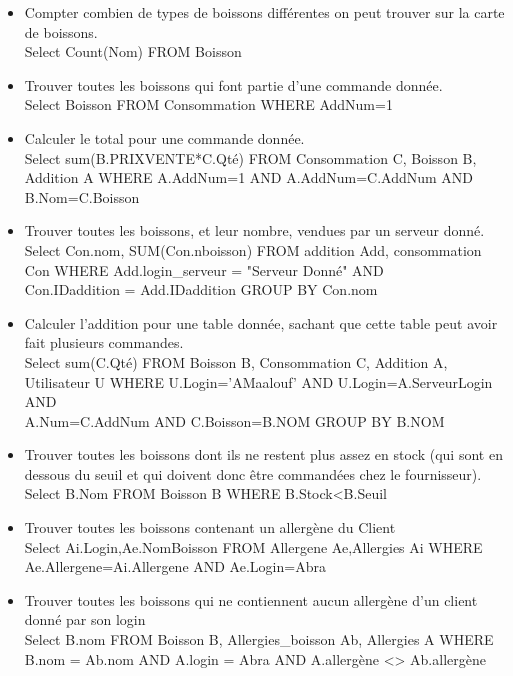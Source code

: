 \documentclass[11pt, a4, oneside, headings=normal]{scrreprt}
\begin{document}
\begin{itemize}
\item Compter combien de types de boissons différentes on peut trouver sur la carte de boissons.
\\ Select Count(Nom) FROM Boisson
\item Trouver toutes les boissons qui font partie d’une commande donnée.
 \\ Select Boisson FROM Consommation WHERE AddNum=1
\item Calculer le total pour une commande donnée.
 \\ Select sum(B.PRIXVENTE*C.Qté) FROM Consommation C, Boisson B, Addition A WHERE A.AddNum=1 AND A.AddNum=C.AddNum AND B.Nom=C.Boisson
\item Trouver toutes les boissons, et leur nombre, vendues par un serveur donné.
 \\ Select Con.nom, SUM(Con.nboisson) FROM addition Add, consommation Con WHERE Add.login\_serveur = "Serveur Donné" AND \\ Con.IDaddition = Add.IDaddition GROUP BY Con.nom
\item Calculer l’addition pour une table donnée, sachant que cette table peut avoir fait plusieurs commandes.
 \\ Select sum(C.Qté) FROM Boisson B, Consommation C, Addition A, Utilisateur U WHERE U.Login='AMaalouf' AND U.Login=A.ServeurLogin AND \\ A.Num=C.AddNum AND C.Boisson=B.NOM GROUP BY B.NOM
\item Trouver toutes les boissons dont ils ne restent plus assez en stock (qui sont en dessous du seuil et
qui doivent donc être commandées chez le fournisseur).
 \\ Select B.Nom FROM Boisson B WHERE B.Stock<B.Seuil
\item Trouver toutes les boissons contenant un allergène du Client
 \\ Select Ai.Login,Ae.NomBoisson FROM Allergene Ae,Allergies Ai WHERE \\ Ae.Allergene=Ai.Allergene AND Ae.Login=Abra
\item Trouver toutes les boissons qui ne contiennent aucun allergène d'un client donné par son login
 \\ Select B.nom FROM Boisson B, Allergies\_boisson Ab, Allergies A WHERE B.nom = Ab.nom AND A.login = Abra AND A.allergène <> Ab.allergène

\end{itemize}
\end{document}

